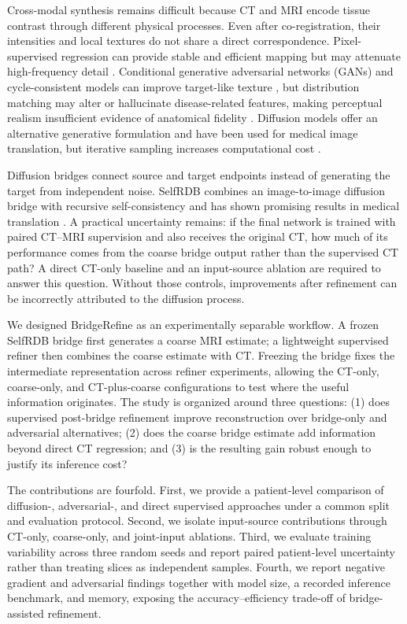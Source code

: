 Cross-modal synthesis remains difficult because CT and MRI encode tissue contrast through different physical processes. Even after co-registration, their intensities and local textures do not share a direct correspondence. Pixel-supervised regression can provide stable and efficient mapping but may attenuate high-frequency detail \cite{chartsias2018multimodal}. Conditional generative adversarial networks (GANs) and cycle-consistent models can improve target-like texture \cite{dar2019multicontrast}, but distribution matching may alter or hallucinate disease-related features, making perceptual realism insufficient evidence of anatomical fidelity \cite{isola2017pix2pix,cohen2018hallucination}. Diffusion models offer an alternative generative formulation and have been used for medical image translation, but iterative sampling increases computational cost \cite{ho2020ddpm,kazerouni2023survey,ozbey2023syndiff}.

Diffusion bridges connect source and target endpoints instead of generating the target from independent noise. SelfRDB combines an image-to-image diffusion bridge with recursive self-consistency and has shown promising results in medical translation \cite{arslan2025selfrdb}. A practical uncertainty remains: if the final network is trained with paired CT--MRI supervision and also receives the original CT, how much of its performance comes from the coarse bridge output rather than the supervised CT path? A direct CT-only baseline and an input-source ablation are required to answer this question. Without those controls, improvements after refinement can be incorrectly attributed to the diffusion process.

We designed BridgeRefine as an experimentally separable workflow. A frozen SelfRDB bridge first generates a coarse MRI estimate; a lightweight supervised refiner then combines the coarse estimate with CT. Freezing the bridge fixes the intermediate representation across refiner experiments, allowing the CT-only, coarse-only, and CT-plus-coarse configurations to test where the useful information originates. The study is organized around three questions: (1) does supervised post-bridge refinement improve reconstruction over bridge-only and adversarial alternatives; (2) does the coarse bridge estimate add information beyond direct CT regression; and (3) is the resulting gain robust enough to justify its inference cost?

The contributions are fourfold. First, we provide a patient-level comparison of diffusion-, adversarial-, and direct supervised approaches under a common split and evaluation protocol. Second, we isolate input-source contributions through CT-only, coarse-only, and joint-input ablations. Third, we evaluate training variability across three random seeds and report paired patient-level uncertainty rather than treating slices as independent samples. Fourth, we report negative gradient and adversarial findings together with model size, a recorded inference benchmark, and memory, exposing the accuracy--efficiency trade-off of bridge-assisted refinement.

